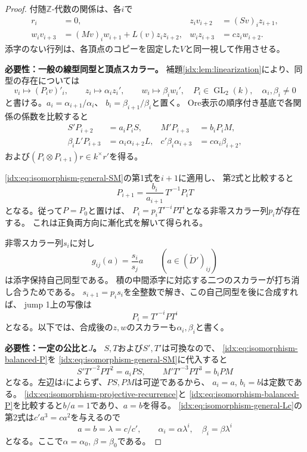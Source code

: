 \documentclass[11pt,a4paper]{ltjsarticle}
\theoremstyle{definition}
\newcommand{\GL}{\operatorname{GL}}
\begin{document}
\begin{proof}
付随$\mathbb Z$-代数の関係は、各$i$で
\begin{align*}
r_i&=0,&
z_i v_{i+2}&=(Sv)_i z_{i+1},\\
w_i v_{i+3}&=(Mv)_i w_{i+1}+L(v)z_i z_{i+2},&
w_i z_{i+3}&=c z_i w_{i+2}.
\end{align*}
添字のない行列は、各頂点のコピーを固定した$V$と同一視して作用させる。

\par\smallskip\noindent\textbf{必要性：一般の線型同型と頂点スカラー。}\quad
補題\ref{idx:lem:linearization}により、同型の存在については
\[
v_i\longmapsto(P_iv)'_i,\qquad
z_i\longmapsto\alpha_i z_i',\qquad
w_i\longmapsto\beta_i w_i',
\quad P_i\in\GL_2(k),\quad\alpha_i,\beta_i\ne0
\]
と書ける。$a_i=\alpha_{i+1}/\alpha_i$、
$b_i=\beta_{i+1}/\beta_i$と置く。
Ore表示の順序付き基底で各関係の係数を比較すると
\begin{align}
S'P_{i+2}&=a_iP_iS,&
M'P_{i+3}&=b_iP_iM,\label{idx:eq:isomorphism-general-SM}\\
\beta_iL'P_{i+3}&=\alpha_i\alpha_{i+2}L,&
c'\beta_i\alpha_{i+3}&=c\alpha_i\beta_{i+2},
\label{idx:eq:isomorphism-general-Lc}
\end{align}
および$(P_i\otimes P_{i+1})r\in k^\times r'$を得る。

\eqref{idx:eq:isomorphism-general-SM}の第1式を$i+1$に適用し、
第2式と比較すると
\begin{equation}\label{idx:eq:isomorphism-projective-recurrence}
P_{i+1}=\frac{b_i}{a_{i+1}}\,T'^{-1}P_iT
\end{equation}
となる。従って$P=P_0$と置けば、
$P_i=p_iT'^{-i}PT^i$となる非零スカラー列$p_i$が存在する。
これは正負両方向に漸化式を解いて得られる。

非零スカラー列$s_i$に対し
\[
g_{ij}(a)=\frac{s_i}{s_j}a\qquad
(a\in(\check D')_{ij})
\]
は添字保持自己同型である。
積の中間添字に対応する二つのスカラーが打ち消し合うためである。
$s_{i+1}=p_is_i$を全整数で解き、この自己同型を後に合成すれば、
jump 1上の写像は
\begin{equation}\label{idx:eq:isomorphism-balanced-P}
P_i=T'^{-i}PT^i
\end{equation}
となる。以下では、合成後の$z,w$のスカラーも$\alpha_i,\beta_i$と書く。

\par\smallskip\noindent\textbf{必要性：一定の公比と$J$。}\quad
$S,T$および$S',T'$は可換なので、
\eqref{idx:eq:isomorphism-balanced-P}を
\eqref{idx:eq:isomorphism-general-SM}に代入すると
\[
S'T'^{-2}PT^2=a_iPS,\qquad
M'T'^{-3}PT^3=b_iPM
\]
となる。左辺は$i$によらず、$PS,PM$は可逆であるから、
$a_i=a$, $b_i=b$は定数である。
\eqref{idx:eq:isomorphism-projective-recurrence}と
\eqref{idx:eq:isomorphism-balanced-P}を比較すると$b/a=1$であり、$a=b$を得る。
\eqref{idx:eq:isomorphism-general-Lc}の第2式は$c'a^3=ca^2$を与えるので
\[
a=b=\lambda=c/c',\qquad
\alpha_i=\alpha\lambda^i,\quad
\beta_i=\beta\lambda^i
\]
となる。ここで$\alpha=\alpha_0$, $\beta=\beta_0$である。


\end{proof}
\end{document}
